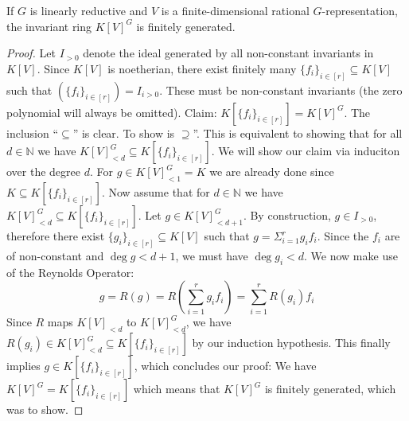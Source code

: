 
\begin{theorem}
  If $G$ is linearly reductive and $V$ is a finite-dimensional rational $G$-representation, the invariant ring $K[V]^G$ is finitely generated.
\end{theorem}

\begin{proof}
  Let $I_{>0}$ denote the ideal generated by all non-constant invariants in $K[V]$.
  Since $K[V]$ is noetherian, there exist finitely many $\{f_i\}_{i \in [r]} \subseteq K[V]$ such that $ \left( \{f_i\}_{i \in [r]} \right) = I_{i>0} $.
  These must be non-constant invariants (the zero polynomial will always be omitted).
  Claim: $K[\{f_i\}_{i \in [r]}] = K[V]^G$.
  The inclusion ``$\subseteq$'' is clear.
  To show is $\supseteq$''.
  This is equivalent to showing that for all $d \in \mathbb{N}$ we have $K[V]^G_{<d} \subseteq K[\{f_i\}_{i \in [r]}] $.
  We will show our claim via induciton over the degree $d$.
  For $g \in K[V]^G_{<1} = K$ we are already done since $K \subseteq K[\{f_i\}_{i \in [r]}]$.
  Now assume that for $d \in \mathbb{N}$ we have $K[V]^G_{<d} \subseteq K[\{f_i\}_{i \in [r]}]$.
  Let $g \in K[V]^G_{< d+1}$.
  By construction, $g \in I_{>0}$, therefore there exist $\{g_i\}_{i \in [r]} \subseteq K[V]$ such that $g = \Sigma_{i=1}^r g_i f_i$.
  Since the $f_i$ are of non-constant and $\operatorname{deg} g < d+1$, we must have $ \operatorname{deg} g_i < d $.
  We now make use of the Reynolds Operator:
  \begin{equation}
      g = R(g)
      =  R \left( \sum_{i=1}^r g_i f_i \right)
      = \sum_{i=1}^r R( g_i) f_i
  \end{equation}
  Since $R$ maps $K[V]_{<d}$ to $K[V]^G_{<d}$, we have $R(g_i) \in K[V]^G_{<d} \subseteq K[\{f_i\}_{i \in [r]}]$ by our induction hypothesis.
  This finally implies $ g \in K[\{f_i\}_{i \in [r]}]$, which concludes our proof:
  We have $K[V]^G = K[\{f_i\}_{i \in [r]}]$ which means that $K[V]^G$ is finitely generated, which was to show.
\end{proof}

